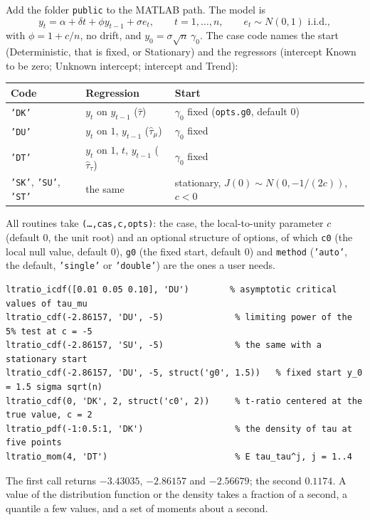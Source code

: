 \documentclass[11pt]{article}
\newcommand{\code}[1]{\texttt{#1}}
\begin{document}
Add the folder \code{public} to the MATLAB path.  The model is
\[
y_t=\alpha+\delta t+\phi y_{t-1}+\sigma e_t,\qquad t=1,\ldots,n,\qquad e_t\sim N(0,1)\text{ i.i.d.},
\]
with $\phi=1+c/n$, no drift, and $y_0=\sigma\sqrt n\,\gamma_0$.  The case code names the start (\textsf{D}eterministic, that is fixed, or \textsf{S}tationary) and the regressors (intercept \textsf{K}nown to be zero; \textsf{U}nknown intercept; intercept and \textsf{T}rend):
\begin{center}
\begin{tabular}{@{}lll@{}}
\toprule
Code & Regression & Start\\
\midrule
\code{'DK'} & $y_t$ on $y_{t-1}$ ($\hat\tau$) & $\gamma_0$ fixed (\code{opts.g0}, default $0$)\\
\code{'DU'} & $y_t$ on $1$, $y_{t-1}$ ($\hat\tau_\mu$) & $\gamma_0$ fixed\\
\code{'DT'} & $y_t$ on $1$, $t$, $y_{t-1}$ ($\hat\tau_\tau$) & $\gamma_0$ fixed\\
\code{'SK'}, \code{'SU'}, \code{'ST'} & the same & stationary, $J(0)\sim N(0,-1/(2c))$, $c<0$\\
\bottomrule
\end{tabular}
\end{center}
All routines take \code{(\ldots,cas,c,opts)}: the case, the local-to-unity parameter $c$ (default $0$, the unit root) and an optional structure of options, of which \code{c0} (the local null value, default $0$), \code{g0} (the fixed start, default $0$) and \code{method} (\code{'auto'}, the default, \code{'single'} or \code{'double'}) are the ones a user needs.
\begin{lstlisting}
ltratio_icdf([0.01 0.05 0.10], 'DU')        % asymptotic critical values of tau_mu
ltratio_cdf(-2.86157, 'DU', -5)              % limiting power of the 5% test at c = -5
ltratio_cdf(-2.86157, 'SU', -5)              % the same with a stationary start
ltratio_cdf(-2.86157, 'DU', -5, struct('g0', 1.5))   % fixed start y_0 = 1.5 sigma sqrt(n)
ltratio_cdf(0, 'DK', 2, struct('c0', 2))     % t-ratio centered at the true value, c = 2
ltratio_pdf(-1:0.5:1, 'DK')                  % the density of tau at five points
ltratio_mom(4, 'DT')                         % E tau_tau^j, j = 1..4
\end{lstlisting}
The first call returns $-3.43035$, $-2.86157$ and $-2.56679$; the second $0.1174$.  A value of the distribution function or the density takes a fraction of a second, a quantile a few values, and a set of moments about a second.
\end{document}

